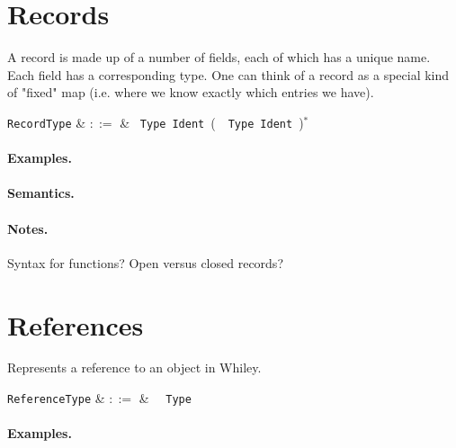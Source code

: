 
\section{Records}

A record is made up of a number of fields, each of which has a unique name. Each field has a corresponding type. One can think of a record as a special kind of "fixed" map (i.e. where we know exactly which entries we have).

\begin{syntax}
  \verb+RecordType+ & $::=$ & \token{\{}\ \verb+Type+\
  \verb+Ident+\ \big(\ \token{,}\ \verb+Type+\ \verb+Ident+\
  \big)$^*$ \ \token{\}}\\
\end{syntax}

\paragraph{Examples.}

\paragraph{Semantics.}

\paragraph{Notes.}  Syntax for functions?  Open versus closed records?


\section{References}

Represents a reference to an object in Whiley.

\begin{syntax}
  \verb+ReferenceType+ & $::=$ & \token{\&}\ \ \verb+Type+\\
\end{syntax}

\paragraph{Examples.}

